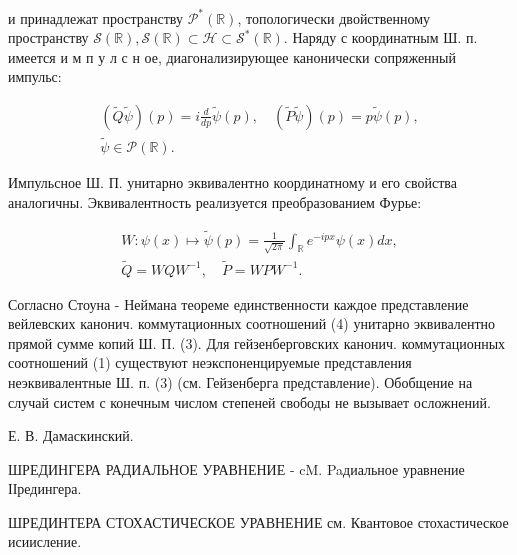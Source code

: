 \documentclass[10pt]{article}
\begin{document}
и принадлежат пространству $\mathscr{P}^{*}(\mathbb{R})$, топологически двойственному пространству $\mathscr{S}(\mathbb{R}), \mathscr{S}(\mathbb{R}) \subset \mathscr{H} \subset \mathscr{S}^{*}(\mathbb{R})$. Наряду с координатным Ш. п. имеется и м п у л с н ое, диагонализирующее канонически сопряженный импульс:



\[

\begin{gathered}

(\tilde{Q} \tilde{\psi})(p)=i \frac{d}{d p} \tilde{\psi}(p), \quad(\tilde{P} \tilde{\psi})(p)=p \tilde{\psi}(p), \\

\tilde{\psi} \in \mathscr{P}(\mathbb{R}) .

\end{gathered}

\]



Импульсное Ш. П. унитарно эквивалентно координатному и его свойства аналогичны. Эквивалентность реализуется преобразованием Фурье:



\[

\begin{gathered}

W: \psi(x) \mapsto \tilde{\psi}(p)=\frac{1}{\sqrt{2 \pi}} \int_{\mathbb{R}} e^{-i p x} \psi(x) d x, \\

\tilde{Q}=W Q W^{-1}, \quad \tilde{P}=W P W^{-1} .

\end{gathered}

\]



Согласно Стоуна - Неймана теореме единственности каждое представление вейлевских канонич. коммутационных соотношений (4) унитарно эквивалентно прямой сумме копий Ш. П. (3). Для гейзенберговских канонич. коммутационных соотношений (1) существуют неэкспоненцируемые представления неэквивалентные Ш. п. (3) (см. Гейзенберга представление). Обобщение на случай систем с конечным числом степеней свободы не вызывает осложнений.



Е. В. Дамаскинский.



ШРЕДИНГЕРА РАДИАЛЬНОЕ УРАВНЕНИЕ - $\mathrm{cM}$. Paдиальное уравнение ІІредингера.



ШРЕДИНТЕРА СТОХАСТИЧЕСКОЕ УРАВНЕНИЕ см. Квантовое стохастическое исиисление.
\end{document}
